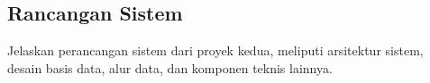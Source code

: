 \subsection{Rancangan Sistem}

Jelaskan perancangan sistem dari proyek kedua, meliputi arsitektur sistem,
desain basis data, alur data, dan komponen teknis lainnya.

